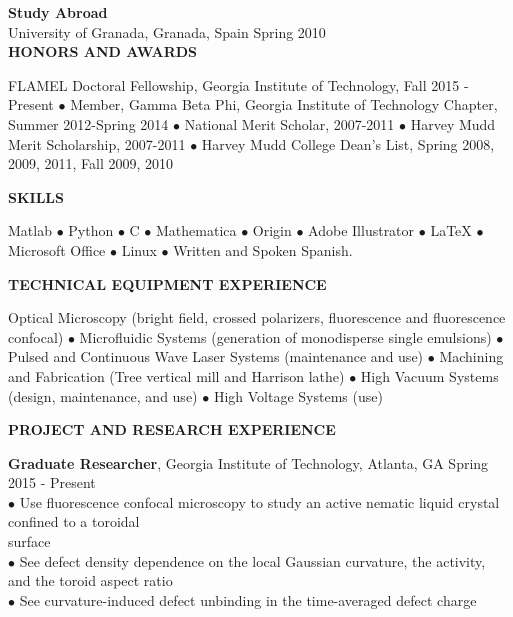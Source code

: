 \documentclass[10pt]{article}
\newenvironment{changemargin}[2]{%
  \list{}{\rightmargin#2\leftmargin#1
    \parsep=0pt\topsep=1pt\partopsep=0pt}
\item[]} {\endlist}
\newenvironment{indentmore}{\begin{changemargin}{10pt}{0cm}}{\end{changemargin}}
\begin{document}
\vspace{5pt}
\textbf{Study Abroad} \\
\hspace*{10pt}University of Granada, Granada, Spain \hfill Spring 2010\\


\textbf{\large HONORS AND AWARDS} 
\begin{indentmore}
FLAMEL Doctoral Fellowship, Georgia Institute of Technology, Fall 2015 - Present $\bullet$  Member, Gamma Beta Phi, Georgia Institute of Technology Chapter, Summer 2012-Spring 2014 $\bullet$ National Merit Scholar, 2007-2011 $\bullet$ Harvey Mudd Merit Scholarship, 2007-2011 $\bullet$ Harvey Mudd College Dean's List, Spring 2008, 2009, 2011, Fall 2009, 2010
\end{indentmore}

\vspace{10pt}
\textbf{\large SKILLS} 
\begin{indentmore}
Matlab  $\bullet$ Python $\bullet$ C $\bullet$ Mathematica $\bullet$
Origin  
$\bullet$ Adobe Illustrator $\bullet$ LaTeX $\bullet$ Microsoft Office $\bullet$ Linux $\bullet$  Written and Spoken Spanish.	
\end{indentmore}
\vspace{10pt}

\textbf{\large TECHNICAL EQUIPMENT EXPERIENCE}
\begin{indentmore}
Optical Microscopy (bright field, crossed polarizers, fluorescence and fluorescence confocal)  
$\bullet$ Microfluidic Systems (generation of monodisperse single emulsions) 
$\bullet$ Pulsed and Continuous Wave Laser Systems (maintenance and use) 
$\bullet$ Machining and Fabrication (Tree vertical mill and Harrison lathe) 
$\bullet$ High Vacuum Systems (design, maintenance, and use) 
$\bullet$ High Voltage Systems (use)
\end{indentmore}
\vspace{10pt}

\textbf{\large PROJECT AND RESEARCH EXPERIENCE} 

{\bf Graduate Researcher}, Georgia Institute of Technology, Atlanta, GA \hfill Spring 2015 - Present\\
\hspace*{10pt}$\bullet$ Use fluorescence confocal microscopy to study an active nematic liquid crystal confined to a toroidal\\ \hspace*{15pt} surface\\
\hspace*{10pt}$\bullet$ See defect density dependence on the local Gaussian curvature, the activity, and the toroid aspect ratio\\
\hspace*{10pt}$\bullet$ See curvature-induced defect unbinding in the time-averaged defect charge\\
\end{document}
